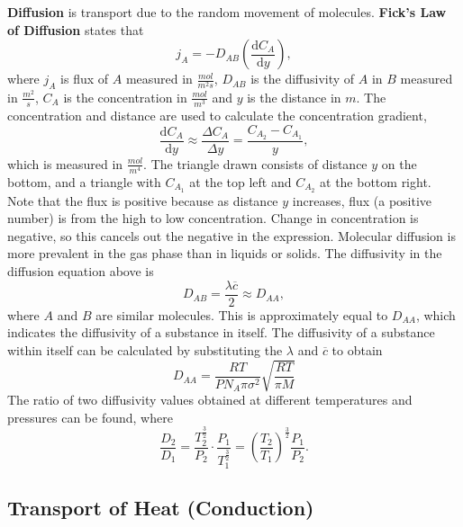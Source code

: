 \documentclass[11pt]{article}
\theoremstyle{plain} %
\theoremstyle{definition}
\theoremstyle{example}
\theoremstyle{remark}
\begin{document}
\textbf{Diffusion} is transport due to the random movement of molecules. \textbf{Fick's Law of Diffusion} states that 
$$j_A = -D_{AB}\left(\frac{\mathrm d C_A}{\mathrm d y}\right),$$
where $j_A$ is flux of $A$ measured in $\frac{mol}{m^2s}$, $D_{AB}$ is the diffusivity of $A$ in $B$ measured in $\frac{m^2}{s}$, $C_A$ is the concentration in $\frac{mol}{m^3}$ and $y$ is the distance in $m$. The concentration and distance are used to calculate the concentration gradient,
$$\frac{\mathrm d C_A}{\mathrm d y} \approx\frac{\Delta C_A}{\Delta y} = \frac{C_{A_2}-C_{A_1}}{y},$$ which is measured in $\frac{mol}{m^4}$. The triangle drawn consists of distance $y$ on the bottom, and a triangle with $C_{A_1}$ at the top left and $C_{A_2}$ at the bottom right. Note that the flux is positive because as distance $y$ increases, flux (a positive number) is from the high to low concentration. Change in concentration is negative, so this cancels out the negative in the expression. Molecular diffusion is more prevalent in the gas phase than in liquids or solids. The diffusivity in the diffusion equation above is $$D_{AB} = \frac{\lambda \overline{c}}{2}\approx D_{AA},$$
where $A$ and $B$ are similar molecules. 
This is approximately equal to $D_{AA}$, which indicates the diffusivity of a substance in itself. The diffusivity of a substance within itself can be calculated by substituting the $\lambda$ and $\overline{c}$ to obtain 
$$D_{AA} = \frac{RT}{PN_A\pi\sigma^2}\sqrt{\frac{RT}{\pi M}}$$
The ratio of two diffusivity values obtained at different temperatures and pressures can be found, where 
$$\frac{D_2}{D_1} = 	\frac{T_2^{\frac{3}{2}}}{P_2}\cdot \frac{P_1}{T_1^{\frac{3}{2}}} = \left(\frac{T_2}{T_1}\right)^{\frac{3}{2}}\frac{P_1}{P_2}.$$
\subsection{Transport of Heat (Conduction)}
	
\end{document}
